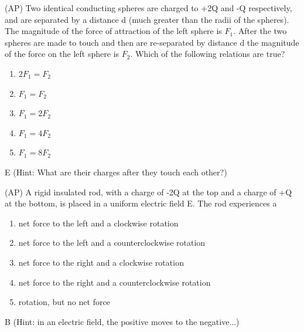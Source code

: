 \begin{question}
(AP) Two identical conducting spheres are charged to +2Q and -Q respectively, and are separated by a distance d (much greater than the radii of the spheres). The magnitude of the force of attraction of the left sphere is $F_1$. After the two spheres are made to touch and then are re-separated by distance d the magnitude of the force on the left sphere is $F_2$. Which of the following relations are true?
\begin{multicols}{5}
\begin{enumerate}[label=(\alph*)]
    \item $2F_1=F_2$
    \item $F_1=F_2$
    \item $F_1=2F_2$
    \item $F_1=4F_2$
    \item $F_1=8F_2$
\end{enumerate}
\end{multicols}

\end{question}

\begin{solution}
E (Hint: What are their charges after they touch each other?)
\end{solution}


\begin{question}
(AP) A rigid insulated rod, with a charge of -2Q at the top and a charge of +Q at the bottom, is placed in a uniform electric field E. The rod experiences a
\begin{enumerate}[label=(\alph*)]
    \item net force to the left and a clockwise rotation
    \item net force to the left and a counterclockwise rotation
    \item net force to the right and a clockwise rotation
    \item net force to the right and a counterclockwise rotation
    \item rotation, but no net force
\end{enumerate}
\end{question}

\begin{solution}
B (Hint: in an electric field, the positive moves to the negative...)
\end{solution}

